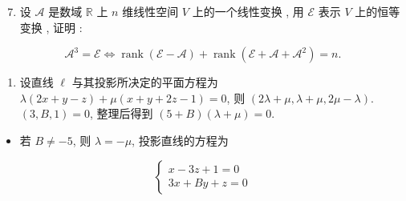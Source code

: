 \documentclass[10pt]{article}
\begin{document}
\begin{enumerate}
  \setcounter{enumi}{6}
  \item  设  $\mathscr{A}$  是数域  $\mathbb{R}$  上  $n$  维线性空间  $V$  上的一个线性变换 ,  用  $\mathscr{E}$  表示  $V$  上的恒等变换 ,  证明 :
\end{enumerate}
$$
\mathscr{A}^{3}=\mathscr{E} \Longleftrightarrow \operatorname{rank}(\mathscr{E}-\mathscr{A})+\operatorname{rank}\left(\mathscr{E}+\mathscr{A}+\mathscr{A}^{2}\right)=n .
$$

\begin{enumerate}
  \item  设直线  $\ell$  与其投影所决定的平面方程为  $\lambda(2 x+y-z)+\mu(x+y+2 z-1)=0$,  则  $(2 \lambda+\mu, \lambda+\mu, 2 \mu-\lambda)$. $(3, B, 1)=0$,  整理后得到  $(5+B)(\lambda+\mu)=0$.
\end{enumerate}
\begin{itemize}
  \item  若  $B \neq-5$,  则  $\lambda=-\mu$,  投影直线的方程为 
\end{itemize}
$$
\left\{\begin{array}{l}
x-3 z+1=0 \\
3 x+B y+z=0
\end{array}\right.
$$
\end{document}
